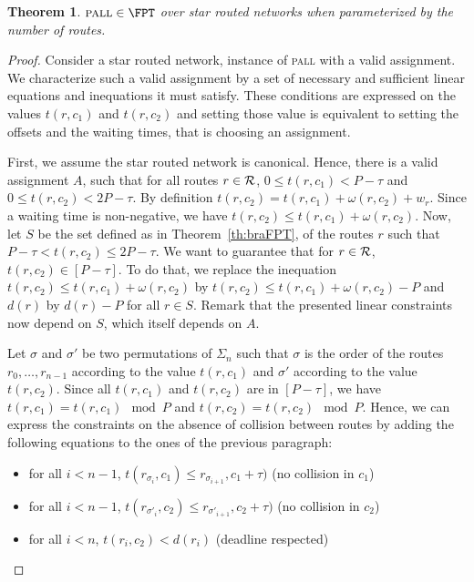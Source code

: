 \documentclass[a4paper,10pt]{journal}
\newtheorem{theorem}{Theorem}
\newcommand\pall{\textsc{pall}\xspace}
\begin{document}
\begin{theorem}\label{th:pallFPT}
$\pall \in \FPT$ over star routed networks when parameterized by the number of routes.
\end{theorem}
\begin{proof}
 Consider a star routed network, instance of \pall with a valid assignment. We characterize such a valid assignment by a set of necessary and sufficient linear equations and inequations it must satisfy.  These conditions are expressed on the values $t(r,c_1)$ and $t(r,c_2)$ and setting those value is equivalent to setting the offsets and the waiting times, that is choosing an assignment.

First, we assume the star routed network is canonical. Hence, there is a valid assignment $A$, such that for all routes $r \in \cal{R}$, $0 \leq t(r,c_1) < P -\tau$ and $0 \leq t(r,c_2) < 2P-\tau$. 
By definition $t(r,c_2) = t(r,c_1) + \omega(r,c_2) + w_r$. Since a waiting time is non-negative, we have $t(r,c_2) \leq t(r,c_1) + \omega(r,c_2)$. 
Now, let $S$ be the set defined as in Theorem~\ref{th:braFPT}, of the routes $r$ such that  $P - \tau < t(r,c_2) \leq 2P - \tau$. We want to guarantee that for $r \in \cal{R}$, $t(r,c_2) \in [P-\tau]$.
To do that, we replace the inequation $t(r,c_2) \leq t(r,c_1) + \omega(r,c_2)$ by $t(r,c_2) \leq t(r,c_1) + \omega(r,c_2) - P$ and $d(r)$ by $d(r) - P$ for all $r \in S$. Remark that the presented linear constraints now depend on $S$, which itself depends on $A$.

 Let $\sigma$ and $\sigma'$ be two permutations of $\Sigma_n$ such that $\sigma$ is the order 
 of the routes $r_0,\dots, r_{n-1}$ according to the value $t(r,c_1)$ and $\sigma'$ according to the value $t(r,c_2)$.  Since all $t(r,c_1)$ and $t(r,c_2)$ are in $[P-\tau]$, we have $t(r,c_1) = t(r,c_1) \mod P $ and $t(r,c_2) = t(r,c_2) \mod P $. Hence, we can express the constraints on the absence of collision between routes by adding the following equations to the ones of the previous paragraph:
 
 \begin{itemize}
 	\item for all $i < n-1$, $t(r_{\sigma_{i}},c_1) \leq r_{\sigma_{i+1}},c_1 + \tau)$ (no collision in $c_1$)
 	\item for all $i < n-1$, $t(r_{\sigma'_{i}},c_2) \leq r_{\sigma'_{i+1}},c_2 + \tau)$ (no collision in $c_2$)
 	\item for all $i < n$,  $t(r_{i},c_2) < d(r_i)$ (deadline respected)
 \end{itemize}


\end{proof}
\end{document}
